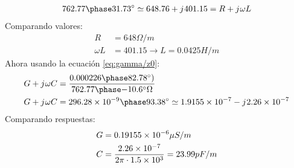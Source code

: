 \documentclass[
	12pt, %
	fleqn, %
	a4paper, %
	oneside, %
]{LegrandOrangeBook}
\begin{document}
\begin{example}
\begin{enumerate}
\begin{align*}
\fase{762.77}{31.73}\simeq 648.76+\iu 401.15=R+\iu\omega L
\end{align*}
Comparando valores:
\begin{align*}
R&=648 \Omega/m\\
\omega L&=401.15\rightarrow L=0.0425 H/m
\end{align*}
Ahora usando la ecuación \ref{eq:gamma/z0}:
\begin{align*}
G+\iu\omega C&=\frac{\fase{0.000226}{82.78})}{\fase{762.77}{-10.6}\Omega}\\
G+\iu\omega C&=\fase{296.28\basedec{-9}}{93.38}\simeq 1.9155\basedec{-7}-\iu 2.26\basedec{-7}
\end{align*}
Comparando respuestas:
\begin{align*}
G&=0.19155\times 10^{-6}\mu S/m\\
C&=\frac{2.26\times 10^{-7}}{2\pi\cdot 1.5\times 10^{3}}=23.99 pF/m
\end{align*}
\end{enumerate}
\end{example}
\end{document}
